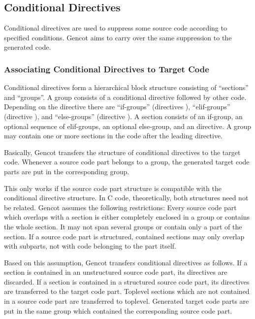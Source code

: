 \subsection{Conditional Directives}

Conditional directives are used to suppress some source code according to specified conditions. Gencot aims to
carry over the same suppression to the generated code.

\subsubsection{Associating Conditional Directives to Target Code}

Conditional directives form a hierarchical block structure consisting of ``sections'' and ``groups''. A group
consists of a conditional directive followed by other code. Depending on the directive there are ``if-groups''
(directives ), ``elif-groups'' (directive ), and ``else-groups''
(directive ). A section consists of an if-group, an optional sequence of elif-groups, an optional
else-group, and an  directive. A group may contain one or more sections in the code after the
leading directive.

Basically, Gencot transfers the structure of conditional directives to the target code. Whenever a source code
part belongs to a group, the generated target code parts are put in the corresponding group. 

This only works if the source code part structure is compatible with the conditional directive structure.
In C code, theoretically, both structures need not be related. Gencot assumes the following restrictions:
Every source code part which overlaps with a section is either completely enclosed in a group or
contains the whole section. It may not span several groups or contain only a part of the section. If a
source code part is structured, contained sections may only overlap with subparts, not with code belonging
to the part itself. 

Based on this assumption, Gencot transfers conditional directives as follows. If a section is contained in an 
unstructured source code part, its directives are discarded. If a section is contained in a structured source
code part, its directives are transferred to the target code part. Toplevel sections which are not contained in
a source code part are transferred to toplevel. Generated target code parts are put in the same group which
contained the corresponding source code part.

